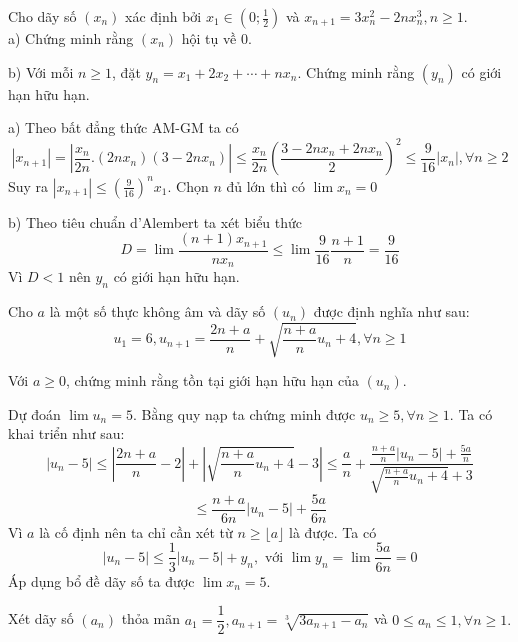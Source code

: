 \documentclass[11pt]{scrartcl}
\begin{document}
\begin{itemize}[label=, leftmargin=0em, itemsep=0.5em]
    \begin{bt}
        Cho dãy số $(x_n)$ xác định bởi $x_1\in (0;\frac{1}{2})$ và $x_{n+1}=3x_n^2-2nx_n^3, n\geq 1$.\\
        a) Chứng minh rằng $(x_n)$ hội tụ về $0$.

        
        b) Với mỗi $n\ge 1$, đặt $y_n=x_1+2x_2+\cdots+n x_n$. Chứng minh rằng $(y_n)$ có giới hạn hữu hạn.
    \end{bt}

    \begin{sol}
        a) Theo bất đẳng thức AM-GM ta có $$|x_{n + 1 }| = |\frac{x_n}{2n}.(2nx_n)\left(3 - 2nx_n\right)| \leq \frac{x_n}{2n}\left(\frac{3 - 2nx_n + 2nx_n}{2}\right)^2 \leq \frac{9}{16}|x_n|, \forall n\geq 2 $$
        Suy ra $|x_{n + 1}| \leq \left(\frac{9}{16}\right)^n x_1$. Chọn $n$ đủ lớn thì có $\lim x_n = 0$


        b) Theo tiêu chuẩn d'Alembert ta xét biểu thức 
        \[D =\lim\frac{(n + 1)x_{n+1}}{nx_n} \leq \lim \frac{9}{16}\frac{n + 1}{n} = \frac{9}{16}\]
        Vì $D < 1$ nên $y_n$ có giới hạn hữu hạn.
    \end{sol}
    \begin{bt}
        Cho $a$ là một số thực không âm và dãy số $(u_n)$ được định nghĩa như sau:
$$u_1=6, u_{n+1} = \frac{2n+a}{n} + \sqrt{\frac{n+a}{n}u_n+4}, \forall n \ge 1$$

Với $a \ge 0$, chứng minh rằng tồn tại giới hạn hữu hạn của $(u_n)$.
    \end{bt}

    \begin{sol}
        Dự đoán $\lim u_n = 5$. Bằng quy nạp ta chứng minh được $u_n \geq 5, \forall n \geq 1$. Ta có khai triển như sau:
        \[
            |u_n - 5| \leq |\frac{2n + a}{n} - 2| + |\sqrt{\frac{n+a}{n}u_n+4} -3| \leq \frac{a}{n} + \frac{\frac{n + a}{n}|u_n - 5| + \frac{5a}{n}}{\sqrt{\frac{ n+a}{n}u_n + 4} + 3}
        \]
        \[
            \leq \frac{n + a}{6n}|u_n - 5| + \frac{5a}{6n}
        \]  
        Vì $a$ là cố định nên ta chỉ cần xét từ $n \geq \lfloor a \rfloor $ là được. Ta có 
        \[|u_n - 5| \leq \frac{1}{3}|u_n -5| + y_n, \text{ với } \lim y_n = \lim \frac{5a}{6n} = 0\]
        Áp dụng bổ đề dãy số ta được $\lim x_n = 5$.
    \end{sol}
    \begin{bt}
        Xét dãy số $(a_n)$ thỏa mãn $a_1=\dfrac{1}{2}, a_{n+1}=\sqrt[3]{3a_{n+1}-a_n}$ và $0\le a_n\le 1, \forall n\ge 1.$


\end{bt}
\end{itemize}
\end{document}

